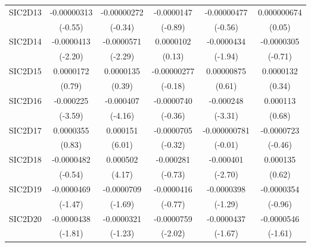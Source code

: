 \begin{table}[htbp]
\begin{tabular}{l*{5}{c}}
SIC2D13     & -0.00000313         & -0.00000272         &  -0.0000147         & -0.00000477         & 0.000000674         \\
            &     (-0.55)         &     (-0.34)         &     (-0.89)         &     (-0.56)         &      (0.05)         \\
SIC2D14     &  -0.0000413\sym{*}  &  -0.0000571\sym{*}  &   0.0000102         &  -0.0000434         &  -0.0000305         \\
            &     (-2.20)         &     (-2.29)         &      (0.13)         &     (-1.94)         &     (-0.71)         \\
SIC2D15     &   0.0000172         &   0.0000135         & -0.00000277         &  0.00000875         &   0.0000132         \\
            &      (0.79)         &      (0.39)         &     (-0.18)         &      (0.61)         &      (0.34)         \\
SIC2D16     &   -0.000225\sym{***}&   -0.000407\sym{***}&  -0.0000740         &   -0.000248\sym{***}&    0.000113         \\
            &     (-3.59)         &     (-4.16)         &     (-0.36)         &     (-3.31)         &      (0.68)         \\
SIC2D17     &   0.0000355         &    0.000151\sym{***}&  -0.0000705         &-0.000000781         &  -0.0000723         \\
            &      (0.83)         &      (6.01)         &     (-0.32)         &     (-0.01)         &     (-0.46)         \\
SIC2D18     &  -0.0000482         &    0.000502\sym{***}&   -0.000281         &   -0.000401\sym{**} &    0.000135         \\
            &     (-0.54)         &      (4.17)         &     (-0.73)         &     (-2.70)         &      (0.62)         \\
SIC2D19     &  -0.0000469         &  -0.0000709         &  -0.0000416         &  -0.0000398         &  -0.0000354         \\
            &     (-1.47)         &     (-1.69)         &     (-0.77)         &     (-1.29)         &     (-0.96)         \\
SIC2D20     &  -0.0000438         &  -0.0000321         &  -0.0000759\sym{*}  &  -0.0000437         &  -0.0000546         \\
            &     (-1.81)         &     (-1.23)         &     (-2.02)         &     (-1.67)         &     (-1.61)         \\

\end{tabular}
\end{table}

